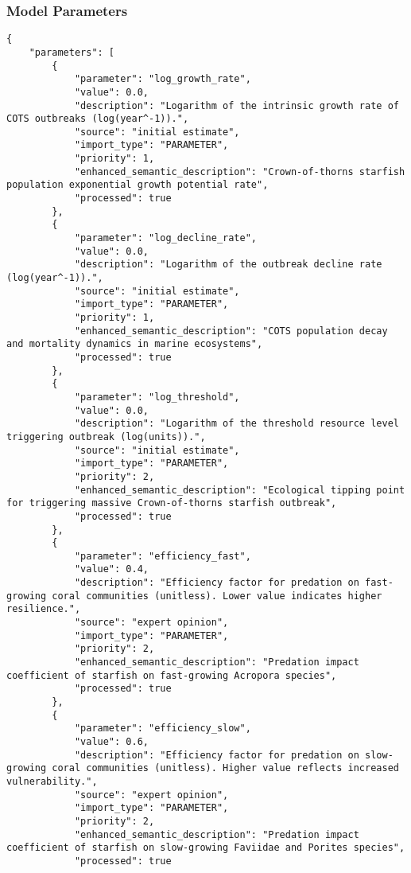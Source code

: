 \subsubsection{Model Parameters}
\begin{lstlisting}
{
    "parameters": [
        {
            "parameter": "log_growth_rate",
            "value": 0.0,
            "description": "Logarithm of the intrinsic growth rate of COTS outbreaks (log(year^-1)).",
            "source": "initial estimate",
            "import_type": "PARAMETER",
            "priority": 1,
            "enhanced_semantic_description": "Crown-of-thorns starfish population exponential growth potential rate",
            "processed": true
        },
        {
            "parameter": "log_decline_rate",
            "value": 0.0,
            "description": "Logarithm of the outbreak decline rate (log(year^-1)).",
            "source": "initial estimate",
            "import_type": "PARAMETER",
            "priority": 1,
            "enhanced_semantic_description": "COTS population decay and mortality dynamics in marine ecosystems",
            "processed": true
        },
        {
            "parameter": "log_threshold",
            "value": 0.0,
            "description": "Logarithm of the threshold resource level triggering outbreak (log(units)).",
            "source": "initial estimate",
            "import_type": "PARAMETER",
            "priority": 2,
            "enhanced_semantic_description": "Ecological tipping point for triggering massive Crown-of-thorns starfish outbreak",
            "processed": true
        },
        {
            "parameter": "efficiency_fast",
            "value": 0.4,
            "description": "Efficiency factor for predation on fast-growing coral communities (unitless). Lower value indicates higher resilience.",
            "source": "expert opinion",
            "import_type": "PARAMETER",
            "priority": 2,
            "enhanced_semantic_description": "Predation impact coefficient of starfish on fast-growing Acropora species",
            "processed": true
        },
        {
            "parameter": "efficiency_slow",
            "value": 0.6,
            "description": "Efficiency factor for predation on slow-growing coral communities (unitless). Higher value reflects increased vulnerability.",
            "source": "expert opinion",
            "import_type": "PARAMETER",
            "priority": 2,
            "enhanced_semantic_description": "Predation impact coefficient of starfish on slow-growing Faviidae and Porites species",
            "processed": true

\end{lstlisting}
